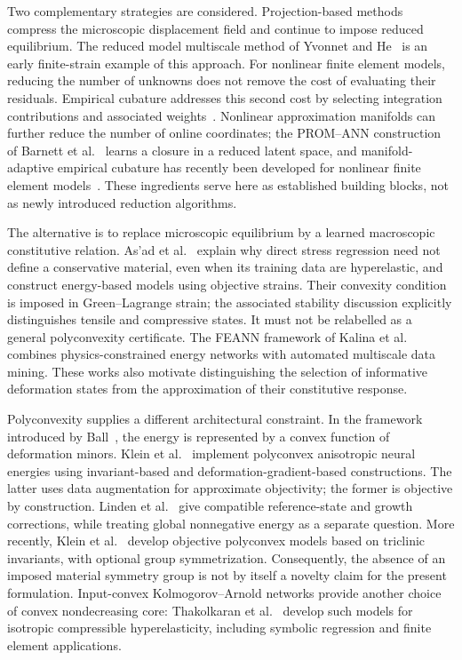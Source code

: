 \documentclass[10pt,a4paper]{article}
\begin{document}
Two complementary strategies are considered. Projection-based methods compress the microscopic displacement field and continue to impose reduced equilibrium. The reduced model multiscale method of Yvonnet and He~\cite{yvonnet2007} is an early finite-strain example of this approach. For nonlinear finite element models, reducing the number of unknowns does not remove the cost of evaluating their residuals. Empirical cubature addresses this second cost by selecting integration contributions and associated weights~\cite{hernandez2017}. Nonlinear approximation manifolds can further reduce the number of online coordinates; the PROM--ANN construction of Barnett et al.~\cite{barnett2023} learns a closure in a reduced latent space, and manifold-adaptive empirical cubature has recently been developed for nonlinear finite element models~\cite{hernandez2026}. These ingredients serve here as established building blocks, not as newly introduced reduction algorithms.

The alternative is to replace microscopic equilibrium by a learned macroscopic constitutive relation. As'ad et al.~\cite{asad2022} explain why direct stress regression need not define a conservative material, even when its training data are hyperelastic, and construct energy-based models using objective strains. Their convexity condition is imposed in Green--Lagrange strain; the associated stability discussion explicitly distinguishes tensile and compressive states. It must not be relabelled as a general polyconvexity certificate. The FEANN framework of Kalina et al.~\cite{kalina2023} combines physics-constrained energy networks with automated multiscale data mining. These works also motivate distinguishing the selection of informative deformation states from the approximation of their constitutive response.

Polyconvexity supplies a different architectural constraint. In the framework introduced by Ball~\cite{ball1977}, the energy is represented by a convex function of deformation minors. Klein et al.~\cite{klein2022} implement polyconvex anisotropic neural energies using invariant-based and deformation-gradient-based constructions. The latter uses data augmentation for approximate objectivity; the former is objective by construction. Linden et al.~\cite{linden2023} give compatible reference-state and growth corrections, while treating global nonnegative energy as a separate question. More recently, Klein et al.~\cite{klein2026} develop objective polyconvex models based on triclinic invariants, with optional group symmetrization. Consequently, the absence of an imposed material symmetry group is not by itself a novelty claim for the present formulation. Input-convex Kolmogorov--Arnold networks provide another choice of convex nondecreasing core: Thakolkaran et al.~\cite{thakolkaran2025} develop such models for isotropic compressible hyperelasticity, including symbolic regression and finite element applications.
\end{document}
